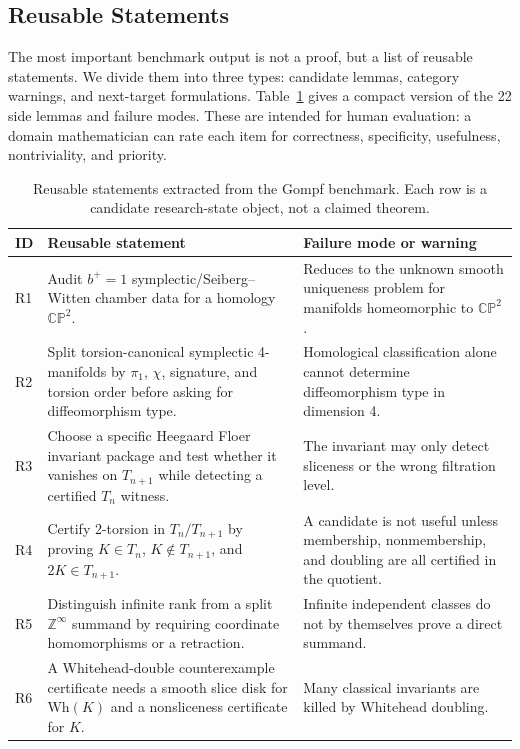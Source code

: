 \documentclass{article}
\theoremstyle{definition}
\theoremstyle{remark}
\begin{document}
\subsection{Reusable Statements}

The most important benchmark output is not a proof, but a list of reusable statements. We divide them into three types: candidate lemmas, category warnings, and next-target formulations. Table~\ref{tab:gompf-reusable} gives a compact version of the 22 side lemmas and failure modes. These are intended for human evaluation: a domain mathematician can rate each item for correctness, specificity, usefulness, nontriviality, and priority.

\begin{table}[t]
  \caption{Reusable statements extracted from the Gompf benchmark. Each row is a candidate research-state object, not a claimed theorem.}
  \label{tab:gompf-reusable}
  \vskip 0.08in
  \centering
  \begin{scriptsize}
  \setlength{\tabcolsep}{3pt}
  \begin{tabular}{p{}p{}p{}}
    \toprule
    ID & Reusable statement & Failure mode or warning \\
    \midrule
    R1 & Audit \(b^+=1\) symplectic/Seiberg--Witten chamber data for a homology \(\mathbb{CP}^2\). & Reduces to the unknown smooth uniqueness problem for manifolds homeomorphic to \(\mathbb{CP}^2\). \\
    R2 & Split torsion-canonical symplectic 4-manifolds by \(\pi_1\), \(\chi\), signature, and torsion order before asking for diffeomorphism type. & Homological classification alone cannot determine diffeomorphism type in dimension 4. \\
    R3 & Choose a specific Heegaard Floer invariant package and test whether it vanishes on \(T_{n+1}\) while detecting a certified \(T_n\) witness. & The invariant may only detect sliceness or the wrong filtration level. \\
    R4 & Certify 2-torsion in \(T_n/T_{n+1}\) by proving \(K\in T_n\), \(K\notin T_{n+1}\), and \(2K\in T_{n+1}\). & A candidate is not useful unless membership, nonmembership, and doubling are all certified in the quotient. \\
    R5 & Distinguish infinite rank from a split \(\mathbb{Z}^{\infty}\) summand by requiring coordinate homomorphisms or a retraction. & Infinite independent classes do not by themselves prove a direct summand. \\
    R6 & A Whitehead-double counterexample certificate needs a smooth slice disk for \(\mathrm{Wh}(K)\) and a nonsliceness certificate for \(K\). & Many classical invariants are killed by Whitehead doubling. \\

\end{tabular}
\end{scriptsize}
\end{table}
\end{document}
